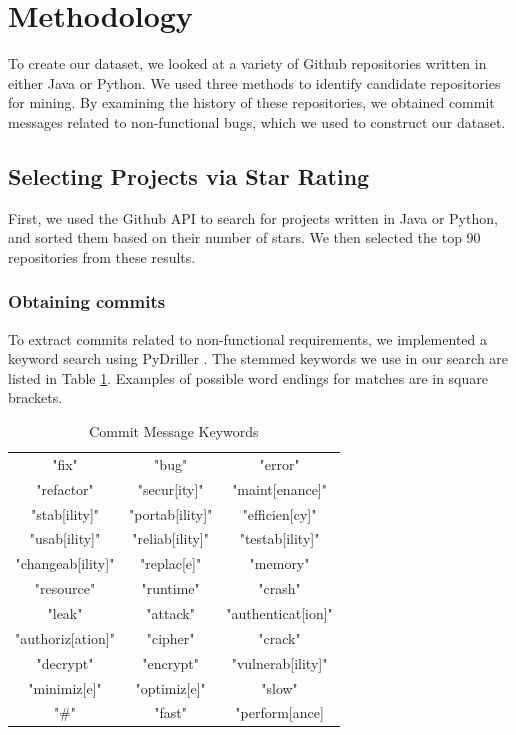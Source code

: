 \documentclass[sigconf]{acmart}
\begin{document}
\section{Methodology}
To create our dataset, we looked at a variety of Github repositories written in either Java or Python. 
We used three methods to identify candidate repositories for mining. By examining the history of these repositories, we obtained commit messages related to non-functional bugs, which we used to construct our dataset.
 
\subsection{Selecting Projects via Star Rating}
First, we used the Github API to search for projects written in Java or Python, and sorted them based on their number of stars. We then selected the top 90 repositories from these results. 

\subsubsection{Obtaining commits}
To extract commits related to non-functional requirements, we implemented a keyword search using PyDriller \cite{Spadini2018}. The stemmed keywords we use in our search are listed in Table \ref{tab:kwds}. Examples of possible word endings for matches are in square brackets.

\begin{table}
  \caption{Commit Message Keywords}
  \label{tab:kwds}
\begin{tabular}{ c c c }
  \toprule
   "fix"             &"bug"           &"error"\\
   "refactor"		 &"secur[ity]"    &"maint[enance]"\\
   "stab[ility]"	 &"portab[ility]" &"efficien[cy]"\\
   "usab[ility]" 	 &"reliab[ility]" &"testab[ility]"\\
   "changeab[ility]" &"replac[e]"     &"memory"\\
   "resource"        &"runtime"       &"crash"\\
   "leak"            &"attack"        &"authenticat[ion]"\\
   "authoriz[ation]" &"cipher"        &"crack" \\ 
   "decrypt"         &"encrypt"       &"vulnerab[ility]"\\ 
   "minimiz[e]"      &"optimiz[e]"    &"slow"\\
   "\#"              &"fast"          &"perform[ance]\\
  \bottomrule
\end{tabular}
\end{table}
\end{document}
